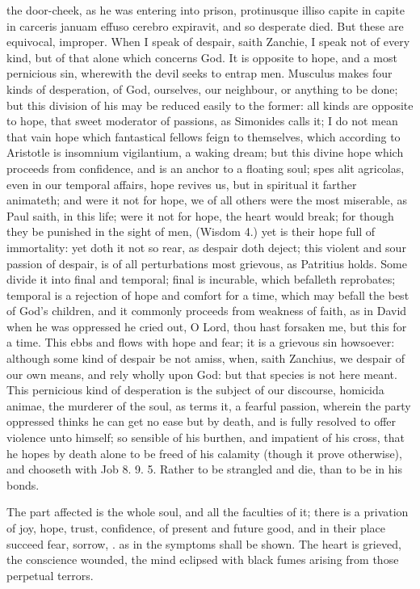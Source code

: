 {the door-cheek, as he was entering into prison, protinusque illiso
capite in capite in carceris januam effuso cerebro expiravit, and so
desperate died. But these are equivocal, improper. When I speak of
despair, saith Zanchie, I speak not of every kind, but of that
alone which concerns God. It is opposite to hope, and a most pernicious
sin, wherewith the devil seeks to entrap men. Musculus makes four kinds
of desperation, of God, ourselves, our neighbour, or anything to be
done; but this division of his may be reduced easily to the former: all
kinds are opposite to hope, that sweet moderator of passions, as
Simonides calls it; I do not mean that vain hope which fantastical
fellows feign to themselves, which according to Aristotle is insomnium
vigilantium, a waking dream; but this divine hope which proceeds from
confidence, and is an anchor to a floating soul; spes alit agricolas,
even in our temporal affairs, hope revives us, but in spiritual it
farther animateth; and were it not for hope, we of all others were the
most miserable, as Paul saith, in this life; were it not for hope, the
heart would break; for though they be punished in the sight of men,
(Wisdom  4.) yet is their hope full of immortality: yet doth it not
so rear, as despair doth deject; this violent and sour passion of
despair, is of all perturbations most grievous, as Patritius
holds. Some divide it into final and temporal; final is
incurable, which befalleth reprobates; temporal is a rejection of hope
and comfort for a time, which may befall the best of God's children,
and it commonly proceeds from weakness of faith, as in David when
he was oppressed he cried out, O Lord, thou hast forsaken me, but this
for a time. This ebbs and flows with hope and fear; it is a grievous
sin howsoever: although some kind of despair be not amiss, when, saith
Zanchius, we despair of our own means, and rely wholly upon God: but
that species is not here meant. This pernicious kind of desperation is
the subject of our discourse, homicida animae, the murderer of the
soul, as \Austin{} terms it, a fearful passion, wherein the party
oppressed thinks he can get no ease but by death, and is fully resolved
to offer violence unto himself; so sensible of his burthen, and
impatient of his cross, that he hopes by death alone to be freed of his
calamity (though it prove otherwise), and chooseth with Job  8. 9.
 5. Rather to be strangled and die, than to be in his bonds.

The part affected is the whole soul, and all the faculties of it;
there is a privation of joy, hope, trust, confidence, of present and
future good, and in their place succeed fear, sorrow, \etc{}. as in the
symptoms shall be shown. The heart is grieved, the conscience wounded,
the mind eclipsed with black fumes arising from those perpetual
terrors.

}
